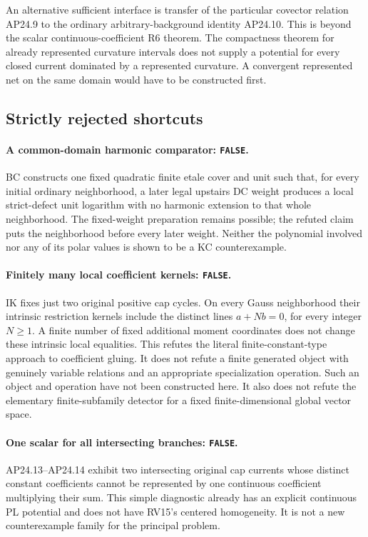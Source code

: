 An alternative sufficient interface is transfer of the particular
covector relation AP24.9 to the ordinary arbitrary-background
identity AP24.10.  This is beyond the scalar continuous-coefficient
R6 theorem.  The compactness theorem for already represented
curvature intervals does not supply a potential for every closed
current dominated by a represented curvature.  A convergent
represented net on the same domain would have to be constructed
first.

\subsection{Strictly rejected shortcuts}

\paragraph{A common-domain harmonic comparator: \texttt{FALSE}.}
BC constructs one fixed quadratic finite etale cover and unit
such that, for every initial ordinary neighborhood, a later
legal upstairs DC weight produces a local strict-defect unit
logarithm with no harmonic extension to that whole neighborhood.
The fixed-weight preparation remains possible; the refuted
claim puts the neighborhood before every later weight.
Neither the polynomial involved nor any of its polar values is
shown to be a KC counterexample.

\paragraph{Finitely many local coefficient kernels: \texttt{FALSE}.}
IK fixes just two original positive cap cycles.  On every Gauss
neighborhood their intrinsic restriction kernels include the
distinct lines \(a+Nb=0\), for every integer \(N\ge1\).
A finite number of fixed additional moment coordinates does
not change these intrinsic local equalities.  This refutes the
literal finite-constant-type approach to coefficient gluing.
It does not refute a finite generated object with genuinely
variable relations and an appropriate specialization operation.
Such an object and operation have not been constructed here.
It also does not refute the elementary finite-subfamily detector
for a fixed finite-dimensional global vector space.

\paragraph{One scalar for all intersecting branches: \texttt{FALSE}.}
AP24.13--AP24.14 exhibit two intersecting original cap currents
whose distinct constant coefficients cannot be represented by
one continuous coefficient multiplying their sum.  This simple
diagnostic already has an explicit continuous PL potential and
does not have RV15's centered homogeneity.  It is not a new
counterexample family for the principal problem.

